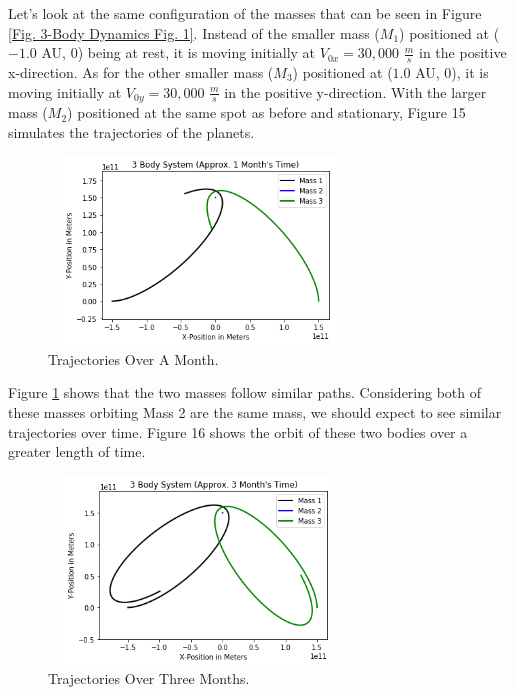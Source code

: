\documentclass[twocolumn]{article}
\begin{document}
Let's look at the same configuration of the masses that can be seen in Figure \ref{Fig. 3-Body Dynamics Fig. 1}. Instead of the smaller mass ($M_1$) positioned at ($-1.0$ AU, 0) being at rest, it is moving initially at $V_{0x}=30,000$ $\frac{m}{s}$ in the positive x-direction. As for the other smaller mass ($M_3$) positioned at ($1.0$ AU, 0), it is moving initially at $V_{0y}=30,000$ $\frac{m}{s}$ in the positive y-direction. With the larger mass ($M_2$) positioned at the same spot as before and stationary, Figure 15 simulates the trajectories of the planets.
\begin{figure}[ht]
    \centering
    \includegraphics[width=8cm, height=5cm]{Figures/3-Body Dynamics (3).png}
    \caption{\small{Trajectories Over A Month.}}
    \label{Fig. 3-Body Dynamics Fig. 3}
\end{figure}
\par \noindent
Figure \ref{Fig. 3-Body Dynamics Fig. 3} shows that the two masses follow similar paths. Considering both of these masses orbiting Mass 2 are the same mass, we should expect to see similar trajectories over time. Figure 16 shows the orbit of these two bodies over a greater length of time.
\begin{figure}[ht]
    \centering
    \includegraphics[width=8cm, height=5cm]{Figures/3-Body Dynamics (4).png}
    \caption{\small{Trajectories Over Three Months.}}
    \label{Fig. 3-Body Dynamics Fig. 4}
\end{figure}
\end{document}
